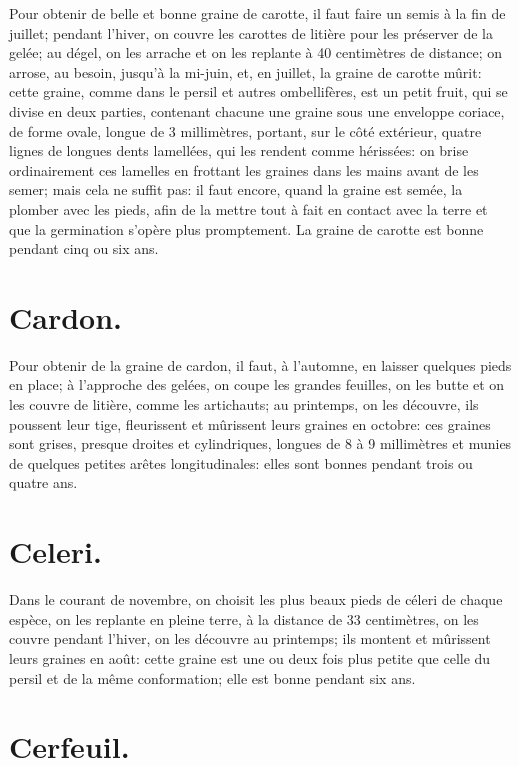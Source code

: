 \documentclass[10pt,a4paper]{book}
\begin{document}
Pour obtenir de belle et bonne graine de carotte, il faut faire un semis à la fin de juillet; pendant l'hiver, on couvre les carottes de litière pour les préserver de la gelée; au dégel, on les arrache et on les replante à 40 centimètres de distance; on arrose, au besoin, jusqu'à la mi-juin, et, en juillet, la graine de carotte mûrit: cette graine, comme dans le persil et autres ombellifères, est un petit fruit, qui se divise en deux parties, contenant chacune une graine sous une enveloppe coriace, de forme ovale, longue de 3 millimètres, portant, sur le côté extérieur, quatre lignes de longues dents lamellées, qui les rendent comme hérissées: on brise ordinairement ces lamelles en frottant les graines dans les mains avant de les semer; mais cela ne suffit pas: il faut encore, quand la graine est semée, la plomber avec les pieds, afin de la mettre tout à fait en contact avec la terre et que la germination s'opère plus promptement. La graine de carotte est bonne pendant cinq ou six ans.

\section{Cardon.}

Pour obtenir de la graine de cardon, il faut, à l'automne, en laisser quelques pieds en place; à l'approche des gelées, on coupe les grandes feuilles, on les butte et on les couvre de litière, comme les artichauts; au printemps, on les découvre, ils poussent leur tige, fleurissent et mûrissent leurs graines en octobre: ces graines sont grises, presque droites et cylindriques, longues de 8 à 9 millimètres et munies de quelques petites arêtes longitudinales: elles sont bonnes pendant trois ou quatre ans.

\section{Celeri.}

Dans le courant de novembre, on choisit les plus beaux pieds de céleri de chaque espèce, on les replante en pleine terre, à la distance de 33 centimètres, on les couvre pendant l'hiver, on les découvre au printemps; ils montent et mûrissent leurs graines en août: cette graine est une ou deux fois plus petite que celle du persil et de la même conformation; elle est bonne pendant six ans.

\section{Cerfeuil.}
\end{document}
